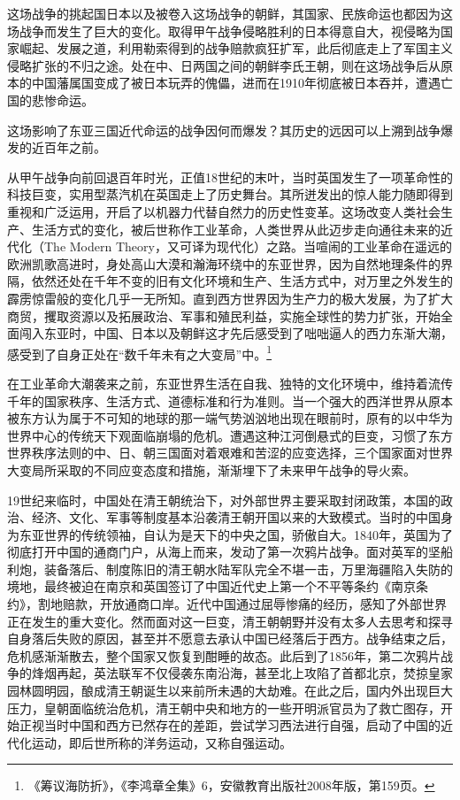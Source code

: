 \documentclass[12pt,UTF8]{ctexbook}
\begin{document}
这场战争的挑起国日本以及被卷入这场战争的朝鲜，其国家、民族命运也都因为这场战争而发生了巨大的变化。取得甲午战争侵略胜利的日本得意自大，视侵略为国家崛起、发展之道，利用勒索得到的战争赔款疯狂扩军，此后彻底走上了军国主义侵略扩张的不归之途。处在中、日两国之间的朝鲜李氏王朝，则在这场战争后从原本的中国藩属国变成了被日本玩弄的傀儡，进而在1910年彻底被日本吞并，遭遇亡国的悲惨命运。

这场影响了东亚三国近代命运的战争因何而爆发？其历史的远因可以上溯到战争爆发的近百年之前。

从甲午战争向前回退百年时光，正值18世纪的末叶，当时英国发生了一项革命性的科技巨变，实用型蒸汽机在英国走上了历史舞台。其所迸发出的惊人能力随即得到重视和广泛运用，开启了以机器力代替自然力的历史性变革。这场改变人类社会生产、生活方式的变化，被后世称作工业革命，人类世界从此迈步走向通往未来的近代化（The Modern Theory，又可译为现代化）之路。当喧闹的工业革命在遥远的欧洲凯歌高进时，身处高山大漠和瀚海环绕中的东亚世界，因为自然地理条件的界隔，依然还处在千年不变的旧有文化环境和生产、生活方式中，对万里之外发生的霹雳惊雷般的变化几乎一无所知。直到西方世界因为生产力的极大发展，为了扩大商贸，攫取资源以及拓展政治、军事和殖民利益，实施全球性的势力扩张，开始全面闯入东亚时，中国、日本以及朝鲜这才先后感受到了咄咄逼人的西力东渐大潮，感受到了自身正处在“数千年未有之大变局”中。\footnote{《筹议海防折》，《李鸿章全集》6，安徽教育出版社2008年版，第159页。}

在工业革命大潮袭来之前，东亚世界生活在自我、独特的文化环境中，维持着流传千年的国家秩序、生活方式、道德标准和行为准则。当一个强大的西洋世界从原本被东方认为属于不可知的地球的那一端气势汹汹地出现在眼前时，原有的以中华为世界中心的传统天下观面临崩塌的危机。遭遇这种江河倒悬式的巨变，习惯了东方世界秩序法则的中、日、朝三国面对着艰难和苦涩的应变选择，三个国家面对世界大变局所采取的不同应变态度和措施，渐渐埋下了未来甲午战争的导火索。

19世纪来临时，中国处在清王朝统治下，对外部世界主要采取封闭政策，本国的政治、经济、文化、军事等制度基本沿袭清王朝开国以来的大致模式。当时的中国身为东亚世界的传统领袖，自认为是天下的中央之国，骄傲自大。1840年，英国为了彻底打开中国的通商门户，从海上而来，发动了第一次鸦片战争。面对英军的坚船利炮，装备落后、制度陈旧的清王朝水陆军队完全不堪一击，万里海疆陷入失防的境地，最终被迫在南京和英国签订了中国近代史上第一个不平等条约《南京条约》，割地赔款，开放通商口岸。近代中国通过屈辱惨痛的经历，感知了外部世界正在发生的重大变化。然而面对这一巨变，清王朝朝野并没有太多人去思考和探寻自身落后失败的原因，甚至并不愿意去承认中国已经落后于西方。战争结束之后，危机感渐渐散去，整个国家又恢复到酣睡的故态。此后到了1856年，第二次鸦片战争的烽烟再起，英法联军不仅侵袭东南沿海，甚至北上攻陷了首都北京，焚掠皇家园林圆明园，酿成清王朝诞生以来前所未遇的大劫难。在此之后，国内外出现巨大压力，皇朝面临统治危机，清王朝中央和地方的一些开明派官员为了救亡图存，开始正视当时中国和西方已然存在的差距，尝试学习西法进行自强，启动了中国的近代化运动，即后世所称的洋务运动，又称自强运动。
\end{document}
